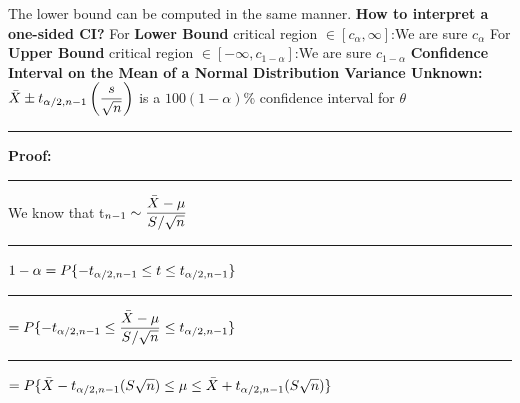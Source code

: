 \documentclass[]{article}
\begin{document}
\newline The lower bound can be computed in the same manner.
\newline
\newline \textbf{How to interpret a one-sided CI?}
\newline For \textbf{Lower Bound} critical region $\in [ c_{\alpha} ,  \infty ]$:We are sure  $c_{\alpha}$ 
\newline
\newline For \textbf{Upper Bound} critical region $\in [ - \infty , c_{1- \alpha} ]$:We are sure  $c_{1- \alpha}$ 
\newline
\newline
\newline
\newline
\Large\textbf{Confidence Interval on the Mean of a Normal Distribution
\newline Variance Unknown:}
\newline
\newline $ \bar{X} \pm t_{\alpha \\/ 2 , n - 1}\left(  \dfrac{s}{\sqrt{n}}  \right)$ is a $100(1-\alpha)\%$ confidence interval for $\theta$
\newline
\newline\Large\rule{3.0cm}{0pt} \textbf{Proof:}
\newline\Large\rule{3.0cm}{0pt} We know that t$_{n-1 }  \sim  \dfrac{\bar{X} - \mu}{ S \\/ \sqrt{n}    }  $
\newline
\newline\Large\rule{3.0cm}{0pt}  $ 1- \alpha =  P \{ - t_{\alpha \\/ 2 , n - 1} \le t \le t_{\alpha \\/ 2 , n - 1}  \}$
\newline
\newline\Large\rule{4.3cm}{0pt}  $=  P \{ - t_{\alpha \\/ 2 , n - 1} \le  \dfrac{\bar{X} - \mu}{ S \\/ \sqrt{n}}  \le t_{\alpha \\/ 2 , n - 1}  \}$
\newline
\newline\Large\rule{4.3cm}{0pt}  $=  P \{ \bar{X}  - t_{\alpha \\/ 2 , n - 1} (S \/ \sqrt{n})  \le \mu \le \bar{X} +  t_{\alpha \\/ 2 , n - 1} ( S \/ \sqrt{n})  \}$
\newline
\end{document}
